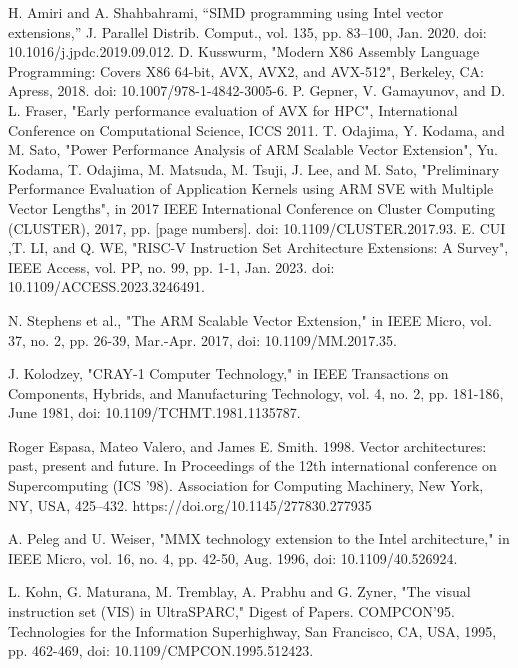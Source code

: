 \documentclass[conference]{IEEEtran}
\begin{document}
\begin{thebibliography}{00}
 H. Amiri and A. Shahbahrami, “SIMD programming using Intel vector extensions,” J. Parallel Distrib. Comput., vol. 135, pp. 83–100, Jan. 2020. doi: 10.1016/j.jpdc.2019.09.012.
 D. Kusswurm, "Modern X86 Assembly Language Programming: Covers X86 64-bit, AVX, AVX2, and AVX-512", Berkeley, CA: Apress, 2018. doi: 10.1007/978-1-4842-3005-6.
 P. Gepner, V. Gamayunov, and D. L. Fraser, "Early performance evaluation of AVX for HPC", International Conference on Computational Science, ICCS 2011.
 T. Odajima, Y. Kodama, and M. Sato, "Power Performance Analysis of ARM Scalable Vector Extension", 
 Yu. Kodama, T. Odajima, M. Matsuda, M. Tsuji, J. Lee, and M. Sato, "Preliminary Performance Evaluation of Application Kernels using ARM SVE with Multiple Vector Lengths", in 2017 IEEE International Conference on Cluster Computing (CLUSTER), 2017, pp. [page numbers]. doi: 10.1109/CLUSTER.2017.93.
 E. CUI ,T. LI, and Q. WE, "RISC-V Instruction Set Architecture Extensions: A Survey",  IEEE Access, vol. PP, no. 99, pp. 1-1, Jan. 2023. doi: 10.1109/ACCESS.2023.3246491.

 N. Stephens et al., "The ARM Scalable Vector Extension," in IEEE Micro, vol. 37, no. 2, pp. 26-39, Mar.-Apr. 2017, doi: 10.1109/MM.2017.35.

 J. Kolodzey, "CRAY-1 Computer Technology," in IEEE Transactions on Components, Hybrids, and Manufacturing Technology, vol. 4, no. 2, pp. 181-186, June 1981, doi: 10.1109/TCHMT.1981.1135787.

 Roger Espasa, Mateo Valero, and James E. Smith. 1998. Vector architectures: past, present and future. In Proceedings of the 12th international conference on Supercomputing (ICS '98). Association for Computing Machinery, New York, NY, USA, 425–432. https://doi.org/10.1145/277830.277935

 A. Peleg and U. Weiser, "MMX technology extension to the Intel architecture," in IEEE Micro, vol. 16, no. 4, pp. 42-50, Aug. 1996, doi: 10.1109/40.526924.

 L. Kohn, G. Maturana, M. Tremblay, A. Prabhu and G. Zyner, "The visual instruction set (VIS) in UltraSPARC," Digest of Papers. COMPCON'95. Technologies for the Information Superhighway, San Francisco, CA, USA, 1995, pp. 462-469, doi: 10.1109/CMPCON.1995.512423.


\end{thebibliography}
\end{document}
